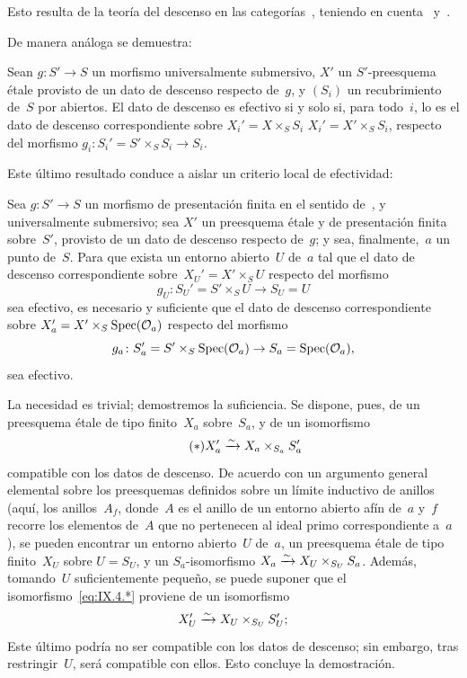 Esto resulta de la teoría del descenso en las categorías~\cite{IX.D},
teniendo en cuenta~ y~.

De manera análoga se demuestra:

\begin{corollaire}
\label{IX.4.3}
Sean $g\colon S'\to S$ un morfismo universalmente submersivo, $X'$ un
$S'$-preesquema étale provisto de un dato de descenso respecto de~$g$, y
$(S_i)$ un recubrimiento de~$S$ por abiertos. El dato de descenso es
efectivo si y solo si, para todo~$i$, lo es el dato de descenso
correspondiente sobre
{$X_i'=X\times_S S_i$}
{$X_i'=X'\times_S S_i$},
respecto del morfismo
$g_i\colon S_i'=S'\times_S S_i\to S_i$.
\end{corollaire}

Este último resultado conduce a aislar un criterio local de efectividad:

\enlargethispage{.3cm}
\begin{proposition}
\label{IX.4.4}
Sea $g\colon S'\to S$ un morfismo de presentación finita en el sentido
de~,
y universalmente submersivo; sea $X'$ un preesquema étale y de
presentación finita sobre~$S'$, provisto de un dato de descenso respecto
de~$g$; y sea, finalmente,~$a$ un punto de~$S$. Para que exista un entorno
abierto~$U$ de~$a$ tal que el dato de descenso correspondiente
sobre~$X_U'=X'\times_S U$ respecto del morfismo
$$g_U\colon S_U'=S'\times_S U\to S_U=U$$
sea efectivo, es necesario y suficiente que el dato de descenso
correspondiente sobre $X_a'=X'\times_S\operatorname{Spec}(\mathcal{O}_a)$ respecto del
morfismo
$$g_a\colon S_a'=S'\times_S\operatorname{Spec}(\mathcal{O}_a)\to
S_a=\operatorname{Spec}(\mathcal{O}_a),$$
sea efectivo.
\end{proposition}

La necesidad es trivial; demostremos la suficiencia. Se dispone, pues, de
un preesquema étale de tipo finito~$X_a$ sobre~$S_a$, y de un isomorfismo
\begin{equation*}
\label{eq:IX.4.*}
\tag{$*$} {X_a'\xrightarrow{\sim}X_a\times_{S_a}S_a'}
\end{equation*}
compatible con los datos de descenso. De acuerdo con un argumento general
elemental sobre los preesquemas definidos sobre un límite inductivo de
anillos (aquí, los anillos~$A_f$, donde~$A$ es el anillo de un entorno
abierto afín de~$a$ y~$f$ recorre los elementos de~$A$ que no pertenecen
al ideal primo correspondiente a~$a$), se pueden encontrar un entorno
abierto~$U$ de~$a$, un preesquema étale de tipo finito~$X_U$ sobre
$U=S_U$, y un $S_a$-isomorfismo
$X_a\xrightarrow{\sim} X_U\times_{S_U}S_a$. Además, tomando~$U$ suficientemente
pequeño, se puede suponer que el isomorfismo~\eqref{eq:IX.4.*} proviene de
un isomorfismo
$$
X_U'\xrightarrow{\sim} X_U\times_{S_U} S_U';
$$
Este último podría no ser compatible con los datos de descenso; sin
embargo, tras restringir~$U$, será compatible con ellos. Esto concluye la
demostración.

